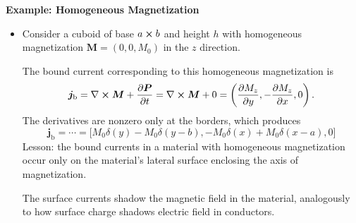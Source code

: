 \documentclass[11pt, a4paper]{article}
\renewcommand{\vec}[1]{\bm{#1}} %
\renewcommand{\P}{\vec{P}}  %
\newcommand{\M}{\vec{M}}  %
\renewcommand{\j}{\vec{j}}  %
\renewcommand{\curl}{\nabla \cross}
\begin{document}
\textbf{Example: Homogeneous Magnetization}
\begin{itemize}
	\item Consider a cuboid of base $ a \cross b $ and height $ h $ with homogeneous magnetization $ \M = (0, 0, M_{0}) $ in the $ z $ direction. 

    The bound current corresponding to this homogeneous magnetization is
	\begin{equation*}
		\j_{\text{b}} = \curl \M + \pdv{\P}{t} = \curl \M + 0 = \left(\pdv{M_{z}}{y}, - \pdv{M_{z}}{x}, 0\right).
	\end{equation*}
	The derivatives are nonzero only at the borders, which produces
	\begin{equation*}
		\j_{\text{b}} = \cdots = \big[M_{0}\delta(y) - M_{0}\delta(y-b), -M_{0}\delta(x) + M_{0}\delta(x - a), 0\big]
	\end{equation*}
	Lesson: the bound currents in a material with homogeneous magnetization occur only on the material's lateral surface enclosing the axis of magnetization. 
	
	The surface currents shadow the magnetic field in the material, analogously to how surface charge shadows electric field in conductors.
\end{itemize}
\end{document}

